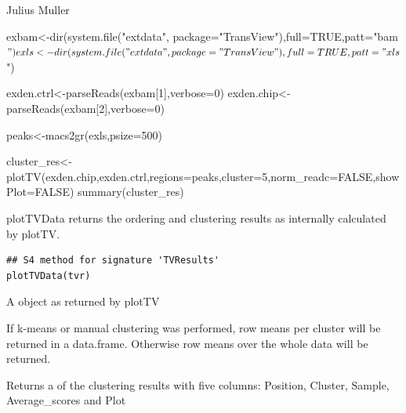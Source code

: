 \documentclass[letterpaper]{book}
\begin{document}
%
\begin{Author}
Julius Muller 
\end{Author}
%
\begin{Examples}
\begin{ExampleCode}

exbam<-dir(system.file("extdata", package="TransView"),full=TRUE,patt="bam$")
exls<-dir(system.file("extdata", package="TransView"),full=TRUE,patt="xls$")

exden.ctrl<-parseReads(exbam[1],verbose=0)
exden.chip<-parseReads(exbam[2],verbose=0)

peaks<-macs2gr(exls,psize=500)

cluster_res<-plotTV(exden.chip,exden.ctrl,regions=peaks,cluster=5,norm_readc=FALSE,showPlot=FALSE)
summary(cluster_res)

\end{ExampleCode}
\end{Examples}
%
\begin{Description}

plotTVData returns the ordering and clustering results as internally calculated by plotTV. 

\end{Description}
%
\begin{Usage}
\begin{verbatim}
## S4 method for signature 'TVResults'
plotTVData(tvr)
\end{verbatim}
\end{Usage}
%
\begin{Arguments}
\begin{ldescription}
\item[\code{tvr}] 
A  object as returned by plotTV

\end{ldescription}
\end{Arguments}
%
\begin{Details}

If k-means or manual clustering was performed, row means per cluster will be returned in a data.frame. Otherwise row means over the whole data will be returned.

\end{Details}
%
\begin{Value}
Returns a  of the clustering results with five columns: Position, Cluster, Sample, Average\_scores and Plot 
\end{Value}
\end{document}
